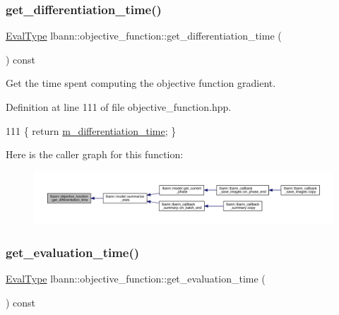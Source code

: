 \subsubsection{\texorpdfstring{get\+\_\+differentiation\+\_\+time()}{get\_differentiation\_time()}}
{\footnotesize\ttfamily \hyperlink{base_8hpp_a3266f5ac18504bbadea983c109566867}{Eval\+Type} lbann\+::objective\+\_\+function\+::get\+\_\+differentiation\+\_\+time (\begin{DoxyParamCaption}{ }\end{DoxyParamCaption}) const\hspace{0.3cm}{\ttfamily [inline]}}

Get the time spent computing the objective function gradient. 

Definition at line 111 of file objective\+\_\+function.\+hpp.


\begin{DoxyCode}
111 \{ \textcolor{keywordflow}{return} \hyperlink{classlbann_1_1objective__function_ae526559f3a530f540a29407ea64bbea6}{m\_differentiation\_time}; \}
\end{DoxyCode}
Here is the caller graph for this function\+:\nopagebreak
\begin{figure}[H]
\begin{center}
\leavevmode
\includegraphics[width=350pt]{classlbann_1_1objective__function_af968b6949c170721d04895f1268b03dd_icgraph}
\end{center}
\end{figure}
\mbox{\label{classlbann_1_1objective__function_a4a23b4c51fe61584c97a471d28f7b8d7}} 
\subsubsection{\texorpdfstring{get\+\_\+evaluation\+\_\+time()}{get\_evaluation\_time()}}
{\footnotesize\ttfamily \hyperlink{base_8hpp_a3266f5ac18504bbadea983c109566867}{Eval\+Type} lbann\+::objective\+\_\+function\+::get\+\_\+evaluation\+\_\+time (\begin{DoxyParamCaption}{ }\end{DoxyParamCaption}) const\hspace{0.3cm}{\ttfamily [inline]}}

